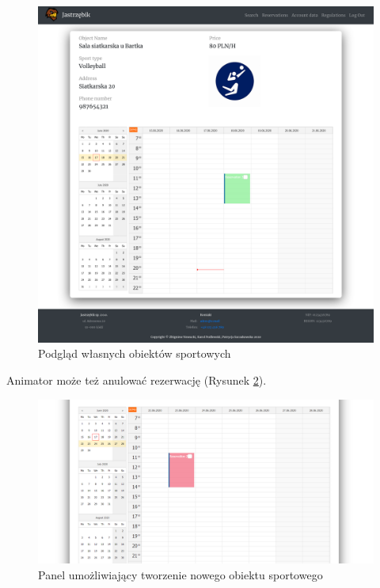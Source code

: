\documentclass[a4paper,11pt]{article}
\begin{document}
    \begin{figure}[H] 
    	\begin{center}
    		\includegraphics[width=1\textwidth]{img3/AnimObj.png}
            \caption{Podgląd własnych obiektów sportowych}
            \label{fig:OwnObj}
    	\end{center}
    \end{figure}      

    Animator może też anulować rezerwację (Rysunek \ref{fig:Can}).
        
    \begin{figure}[H] 
    	\begin{center}
    		\includegraphics[width=1\textwidth]{img3/Canceled.png}
            \caption{Panel umożliwiający tworzenie nowego obiektu sportowego}
            \label{fig:Can}
    	\end{center}
    \end{figure}      
\end{document}
